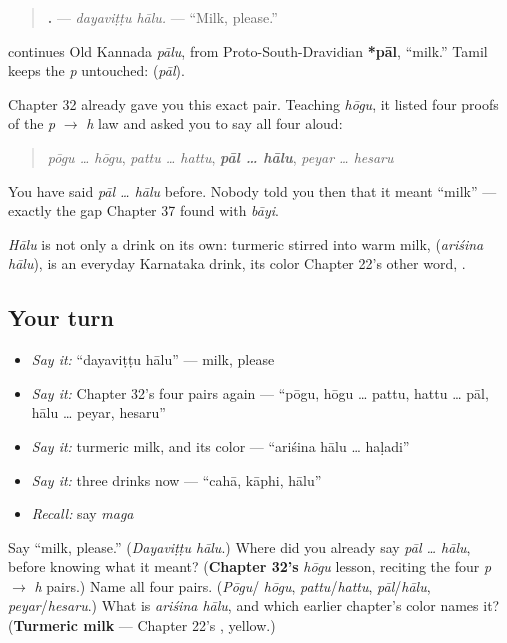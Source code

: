 \begin{quote}
\textbf{ .} — \emph{dayaviṭṭu hālu.} — \textquotedblleft{}Milk, please.\textquotedblright{}
\end{quote}

\begin{cousinweb}
\textbf{} continues Old Kannada \emph{pālu}, from Proto-South-Dravidian \textbf{*pāl}, \textquotedblleft{}milk.\textquotedblright{} Tamil keeps the \emph{p} untouched: \textbf{} (\emph{pāl}).

Chapter 32 already gave you this exact pair. Teaching \emph{hōgu}, it listed four proofs of the \emph{p} $\to$ \emph{h} law and asked you to say all four aloud:

\begin{quote}
\emph{pōgu … hōgu}, \emph{pattu … hattu}, \emph{\textbf{pāl … hālu}}, \emph{peyar … hesaru}
\end{quote}

You have said \emph{pāl … hālu} before. Nobody told you then that it meant \textquotedblleft{}milk\textquotedblright{} — exactly the gap Chapter 37 found with \emph{bāyi}.

\emph{Hālu} is not only a drink on its own: turmeric stirred into warm milk, \textbf{ } (\emph{ariśina hālu}), is an everyday Karnataka drink, its color Chapter 22's other word, \textbf{}.
\end{cousinweb}

\subsection*{Your turn}
\begin{itemize}
\raggedright
  \item \emph{Say it:} \textquotedblleft{}dayaviṭṭu hālu\textquotedblright{} — milk, please
  \item \emph{Say it:} Chapter 32's four pairs again — \textquotedblleft{}pōgu, hōgu … pattu, hattu … pāl, hālu … peyar, hesaru\textquotedblright{}
  \item \emph{Say it:} turmeric milk, and its color — \textquotedblleft{}ariśina hālu … haḷadi\textquotedblright{}
  \item \emph{Say it:} three drinks now — \textquotedblleft{}cahā, kāphi, hālu\textquotedblright{}
  \item \emph{Recall:} say \emph{maga}
\end{itemize}

\begin{tcolorbox}[breakable,colback=teal!4,colframe=teal!35!black,title={Before you move on}]
Say \textquotedblleft{}milk, please.\textquotedblright{} (\emph{Dayaviṭṭu hālu}.) Where did you already say \emph{pāl … hālu}, before knowing what it meant? (\textbf{Chapter 32's} \emph{hōgu} lesson, reciting the four \emph{p} $\to$ \emph{h} pairs.) Name all four pairs. (\emph{Pōgu}/ \emph{hōgu}, \emph{pattu}/\emph{hattu}, \emph{pāl}/\emph{hālu}, \emph{peyar}/\emph{hesaru}.) What is \emph{ariśina hālu}, and which earlier chapter's color names it? (\textbf{Turmeric milk} — Chapter 22's \textbf{}, yellow.)
\end{tcolorbox}
